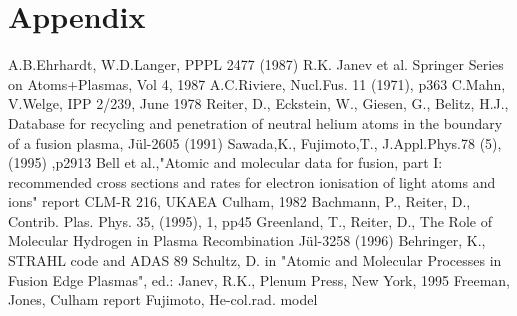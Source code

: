 \documentclass[12pt]{article}
\begin{document}
\section{Appendix}
\newpage
\begin{thebibliography}{99}
  A.B.Ehrhardt, W.D.Langer, PPPL 2477 (1987)
 R.K. Janev et al.  Springer Series on Atoms+Plasmas,
                   Vol 4, 1987
 A.C.Riviere, Nucl.Fus. 11 (1971), p363
 C.Mahn, V.Welge, IPP 2/239, June 1978
 Reiter, D., Eckstein, W., Giesen, G., Belitz,
                    H.J.,
                    Database for recycling and penetration of neutral
                    helium atoms in the boundary of a fusion plasma,
                    J\"ul-2605 (1991)
 Sawada,K.,  Fujimoto,T., J.Appl.Phys.78 (5), (1995)
                    ,p2913
  Bell et al.,"Atomic and molecular data for fusion, part I:
recommended cross sections and rates for electron ionisation of light atoms and ions"
 report CLM-R 216, UKAEA Culham, 1982
  Bachmann, P., Reiter, D., Contrib. Plas. Phys.
                       35, (1995), 1, pp45
 Greenland, T., Reiter, D.,
                    The Role of Molecular Hydrogen in Plasma
                    Recombination
                    J\"ul-3258 (1996)
 Behringer, K., STRAHL code and ADAS 89
 Schultz, D. in "Atomic and Molecular Processes in Fusion
                     Edge Plasmas", ed.: Janev, R.K., Plenum Press, New York, 1995
 Freeman, Jones, Culham report
 Fujimoto, He-col.rad. model
 \end{thebibliography}
\end{document}

